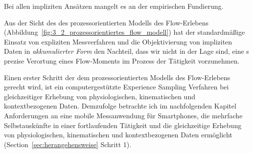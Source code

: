 Bei allen impliziten Ansätzen mangelt es an der empirischen Fundierung. 

Aus der Sicht des des prozessorientierten Modells des Flow-Erlebens (Abbildung~\ref{fig:3_2_prozessorientiertes_flow_modell}) hat der standardmäßige Einsatz von expliziten Messverfahren und die Objektivierung von impliziten Daten in \emph{akkumulierter Form} den Nachteil, dass wir nicht in der Lage sind, eine s prezise Verortung eines Flow-Moments im Prozess der Tätigkeit vorzunehmen. 

Einen erster Schritt der dem prozessorientierten Modells des Flow-Erlebens gerecht wird, ist ein computergestützte Experience Sampling Verfahren bei gleichzeitiger Erhebung von physiologischen, kinematischen und kontextbezogenen Daten. Demzufolge betrachte ich im nachfolgenden Kapitel Anforderungen an eine mobile Messanwendung für Smartphones, die mehrfache Selbstauskünfte in einer fortlaufenden Tätigkeit und die gleichzeitige Erhebung von physiologischen, kinematischen und kontextbezogenen Daten ermöglicht (Section~\ref{sec:herangehensweise} Schritt 1).

